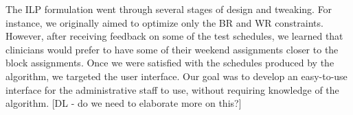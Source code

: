 The ILP formulation went through several stages of design and tweaking.
For instance, we originally aimed to optimize only the BR and WR constraints.
However, after receiving feedback on some of the test schedules, we learned that 
clinicians would prefer to have some of their weekend assignments closer to the block assignments.
Once we were satisfied with the schedules produced by the algorithm, we targeted the
user interface. Our goal was to develop an easy-to-use interface for the administrative staff to use,
without requiring knowledge of the algorithm. [DL - do we need to elaborate more on this?]